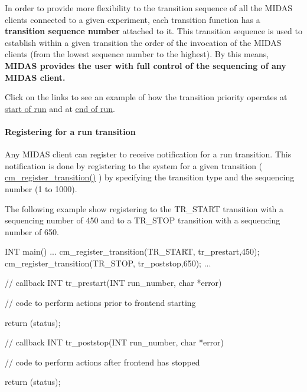 In order to provide more flexibility to the transition sequence of all the MIDAS clients connected to a given experiment, each transition function has a {\bfseries  transition sequence number } attached to it. This transition sequence is used to establish within a given transition the order of the invocation of the MIDAS clients (from the lowest sequence number to the highest). By this means, {\bfseries  MIDAS provides the user with full control of the sequencing of any MIDAS client. }

Click on the links to see an example of how the transition priority operates at \hyperlink{RC_odbedit_examples_RC_transition_start}{start of run} and at \hyperlink{RC_odbedit_examples_RC_transition_stop}{end of run}.

\par


\par
 \label{RC_Run_States_and_Transitions_idx_transition_register}
\hypertarget{RC_Run_States_and_Transitions_idx_transition_register}{}
 \hypertarget{RC_Run_States_and_Transitions_RC_Register_for_run_transition}{}\paragraph{Registering for a run transition}\label{RC_Run_States_and_Transitions_RC_Register_for_run_transition}
Any MIDAS client can register to receive notification for a run transition. This notification is done by registering to the system for a given transition ( \hyperlink{group__cmfunctionc_ga00950930acadf846be75239b6d0e80dc}{cm\_\-register\_\-transition()} ) by specifying the transition type and the sequencing number (1 to 1000). \par
 The following example show registering to the TR\_\-START transition with a sequencing number of 450 and to a TR\_\-STOP transition with a sequencing number of 650.


\begin{DoxyCode}
  INT main()
  {
    ...
  cm_register_transition(TR_START, tr_prestart,450);
  cm_register_transition(TR_STOP, tr_poststop,650);
    ...
  }

  // callback
  INT tr_prestart(INT run_number, char *error)
  {
        // code to perform actions prior to frontend starting 

        return (status);
  }

  // callback
  INT tr_poststop(INT run_number, char *error)
  {
        // code to perform actions after frontend has stopped 

        return (status);
  }
\end{DoxyCode}



